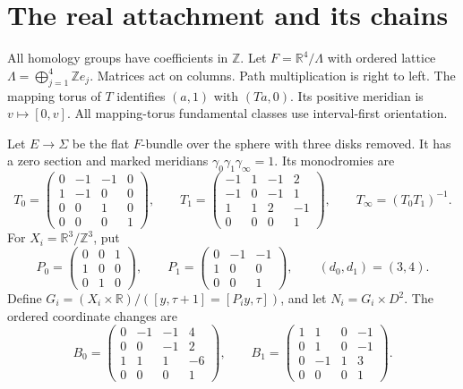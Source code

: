\section{The real attachment and its chains}

All homology groups have coefficients in $\mathbb Z$.
Let $F=\mathbb R^4/\Lambda$ with ordered lattice
$\Lambda=\bigoplus_{j=1}^4\mathbb Ze_j$.
Matrices act on columns. Path multiplication is right to left.
The mapping torus of $T$ identifies $(a,1)$ with $(Ta,0)$.
Its positive meridian is $v\mapsto[0,v]$.
All mapping-torus fundamental classes use interval-first orientation.

Let $E\to\Sigma$ be the flat $F$-bundle over the sphere with three disks removed.
It has a zero section and marked meridians
$\gamma_0\gamma_1\gamma_\infty=1$.
Its monodromies are
\[
T_0=\begin{pmatrix}0&-1&-1&0\\1&-1&0&0\\0&0&1&0\\0&0&0&1\end{pmatrix},
\qquad
T_1=\begin{pmatrix}-1&1&-1&2\\-1&0&-1&1\\1&1&2&-1\\0&0&0&1\end{pmatrix},
\qquad T_\infty=(T_0T_1)^{-1}.
\]
For $X_i=\mathbb R^3/\mathbb Z^3$, put
\[
P_0=\begin{pmatrix}0&0&1\\1&0&0\\0&1&0\end{pmatrix},\qquad
P_1=\begin{pmatrix}0&-1&-1\\1&0&0\\0&0&1\end{pmatrix},\qquad
(d_0,d_1)=(3,4).
\]
Define $G_i=(X_i\times\mathbb R)/([y,\tau+1]=[P_i y,\tau])$,
and let $N_i=G_i\times D^2$.
The ordered coordinate changes are
\begin{equation}\label{th:eq:B}
B_0=\begin{pmatrix}0&-1&-1&4\\0&0&-1&2\\1&1&1&-6\\0&0&0&1\end{pmatrix},
\qquad
B_1=\begin{pmatrix}1&1&0&-1\\0&1&0&-1\\0&-1&1&3\\0&0&0&1\end{pmatrix}.
\end{equation}
